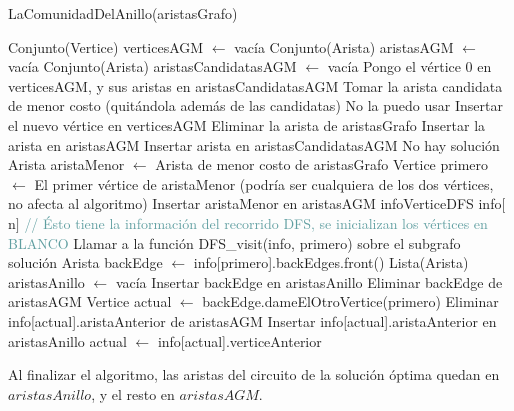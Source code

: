 \begin{algorithm}[H]
\begin{algorithmic}[1]
\caption{LaComunidadDelAnillo(aristasGrafo)}
\STATE Conjunto(Vertice) verticesAGM $\leftarrow$ vacía
\STATE Conjunto(Arista) aristasAGM $\leftarrow$ vacía
\STATE Conjunto(Arista) aristasCandidatasAGM $\leftarrow$ vacía
\STATE Pongo el vértice 0 en verticesAGM, y sus aristas en aristasCandidatasAGM
	\STATE Tomar la arista candidata de menor costo (quitándola además de las candidatas)
        \STATE No la puedo usar
    \ELSE
        \STATE Insertar el nuevo vértice en verticesAGM
        \STATE Eliminar la arista de aristasGrafo
        \STATE Insertar la arista en aristasAGM
            \STATE Insertar arista en aristasCandidatasAGM
        \ENDFOR
    \ENDIF
\ENDWHILE
{}
    \STATE No hay solución
\ENDIF
\STATE Arista aristaMenor $\leftarrow$ Arista de menor costo de aristasGrafo
\STATE Vertice primero $\leftarrow$ El primer vértice de aristaMenor (podría ser cualquiera de los dos vértices, no afecta al algoritmo)
\STATE Insertar aristaMenor en aristasAGM
\STATE infoVerticeDFS info$[$n$]$ \textcolor{CadetBlue}{// Ésto tiene la información del recorrido DFS, se inicializan los vértices en BLANCO}
\STATE Llamar a la función DFS\_visit(info, primero) sobre el subgrafo solución
\STATE Arista backEdge $\leftarrow$ info[primero].backEdges.front()
\STATE Lista(Arista) aristasAnillo $\leftarrow$ vacía
\STATE Insertar backEdge en aristasAnillo
\STATE Eliminar backEdge de aristasAGM
\STATE Vertice actual $\leftarrow$ backEdge.dameElOtroVertice(primero)
    \STATE Eliminar info[actual].aristaAnterior de aristasAGM
    \STATE Insertar info[actual].aristaAnterior en aristasAnillo
    \STATE actual $\leftarrow$ info[actual].verticeAnterior
\ENDWHILE
\end{algorithmic}
\end{algorithm}

Al finalizar el algoritmo, las aristas del circuito de la solución óptima quedan en $aristasAnillo$, y el resto en $aristasAGM$.

